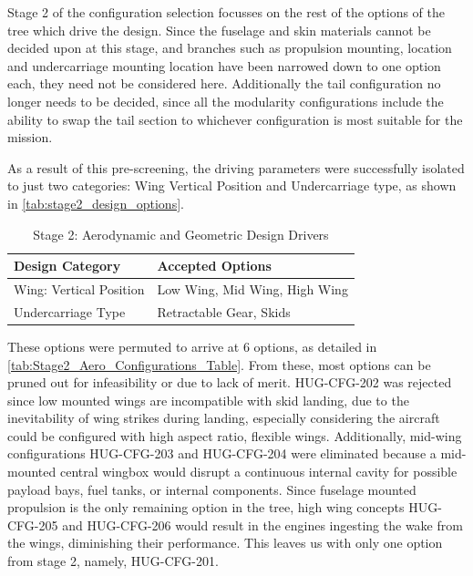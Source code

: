 Stage 2 of the configuration selection focusses on the rest of the options of the tree which drive the design. Since the fuselage and skin materials cannot be decided upon at this stage, and branches such as propulsion mounting, location and undercarriage mounting location have been narrowed down to one option each, they need not be considered here. Additionally the tail configuration no longer needs to be decided, since all the modularity configurations include the ability to swap the tail section to whichever configuration is most suitable for the mission.  

As a result of this pre-screening, the driving parameters were successfully isolated to just two categories: Wing Vertical Position and Undercarriage type, as shown in \autoref{tab:stage2_design_options}.

\begin{table}[H]
    \centering
    \caption{Stage 2: Aerodynamic and Geometric Design Drivers}
    \label{tab:stage2_design_options}
    \renewcommand{\arraystretch}{1.2}
    \begin{tabular}{|l|p{10cm}|}
        \hline
        \textbf{Design Category} & \textbf{Accepted Options} \\ \hline \hline
        Wing: Vertical Position & Low Wing, Mid Wing, High Wing \\ \hline
        Undercarriage Type & Retractable Gear, Skids \\ \hline
    \end{tabular}
\end{table}

These options were permuted to arrive at 6 options, as detailed in \autoref{tab:Stage2_Aero_Configurations_Table}. From these, most options can be pruned out for infeasibility or due to lack of merit. HUG-CFG-202 was rejected since low mounted wings are incompatible with skid landing, due to the inevitability of wing strikes during landing, especially considering the aircraft could be configured with high aspect ratio, flexible wings. Additionally, mid-wing configurations HUG-CFG-203 and HUG-CFG-204 were eliminated because a mid-mounted central wingbox would disrupt a continuous internal cavity for possible payload bays, fuel tanks, or internal components. Since fuselage mounted propulsion is the only remaining option in the tree, high wing concepts HUG-CFG-205 and HUG-CFG-206 would result in the engines ingesting the wake from the wings, diminishing their performance. This leaves us with only one option from stage 2, namely, HUG-CFG-201.

